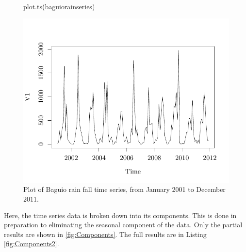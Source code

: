 \begin{figure}[!ht]
\centering
\begin{Schunk}
\begin{Sinput}
plot.ts(baguiorainseries)
\end{Sinput}

\includegraphics[width=.7\textwidth]{figure/listings-YeastBoxPlot} \end{Schunk}


\caption{\label{fig:TSPlot} Plot of Baguio rain fall time series, from January 2001 to December 2011.}
\end{figure}

Here, the time series data is broken down into its components. This is done in preparation to eliminating the seasonal component of the data. Only the partial results are shown in \eqref{fig:Components}. The full results are in Listing \eqref{fig:Components2}.

